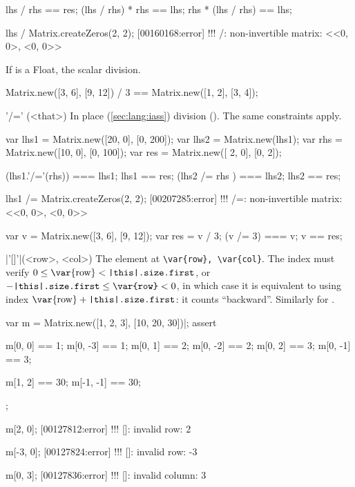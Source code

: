 \begin{urbiscriptapi}
\begin{urbiassert}
lhs / rhs == res;
(lhs / rhs) * rhs == lhs;
rhs * (lhs / rhs) == lhs;

lhs / Matrix.createZeros(2, 2);
[00160168:error] !!! /: non-invertible matrix: <<0, 0>, <0, 0>>
\end{urbiassert}

  If \that is a Float, the scalar division.
\begin{urbiassert}
Matrix.new([3, 6], [9, 12]) / 3 == Matrix.new([1, 2], [3, 4]);
\end{urbiassert}



\item['/='](<that>)%
  In place (\autoref{sec:lang:iass}) division ().  The same
  constraints apply.
\begin{urbiassert}
var lhs1 = Matrix.new([20, 0], [0, 200]);
var lhs2 = Matrix.new(lhs1);
var rhs = Matrix.new([10, 0], [0, 100]);
var res = Matrix.new([ 2, 0], [0,   2]);

(lhs1.'/='(rhs)) === lhs1;  lhs1 == res;
(lhs2  /=  rhs ) === lhs2;  lhs2 == res;

lhs1 /= Matrix.createZeros(2, 2);
[00207285:error] !!! /=: non-invertible matrix: <<0, 0>, <0, 0>>
\end{urbiassert}

\begin{urbiassert}
var v = Matrix.new([3, 6], [9, 12]);
var res = v / 3;
(v /= 3) === v; v == res;
\end{urbiassert}


\item|'[]'|(<row>, <col>)%
  The element at \lstinline|\var{row}, \var{col}|.  The index  must
  verify $0 \le \textrm{\var{row}} < \texttt{\this.size.first}$, or
  $-\texttt{\this.size.first} \le \texttt{\var{row}} < 0$, in which case it
  is equivalent to using index $\textrm{\var{row}} +
  \texttt{\this.size.first}$: it counts ``backward''.  Similarly for
  .
\begin{urbiscript}
var m = Matrix.new([1, 2, 3], [10, 20, 30])|;
assert
{
  m[0, 0] == 1;   m[0, -3] == 1;
  m[0, 1] == 2;   m[0, -2] == 2;
  m[0, 2] == 3;   m[0, -1] == 3;

  m[1, 2] == 30;  m[-1, -1] == 30;
};

m[2, 0];
[00127812:error] !!! []: invalid row: 2

m[-3, 0];
[00127824:error] !!! []: invalid row: -3

m[0, 3];
[00127836:error] !!! []: invalid column: 3


\end{urbiscript}
\end{urbiscriptapi}

